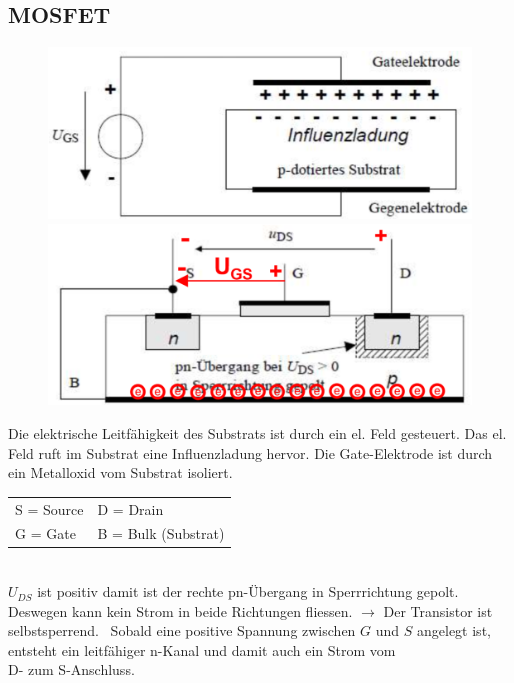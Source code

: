 \subsection{MOSFET}
\begin{figure}
    \vspace{-1cm}
    \includegraphics[width=\linewidth]{images/mosfetprinz}
    \newline
    \includegraphics[width=\linewidth]{images/mosfetprak}
\end{figure}
Die elektrische Leitfähigkeit des Substrats ist durch ein el. Feld gesteuert. Das el. Feld ruft im Substrat eine Influenzladung hervor.\newline
Die Gate-Elektrode ist durch ein Metalloxid vom Substrat isoliert.\\[0.3cm]
\begin{tabular}{ll}
    S = Source & D = Drain\\
    G = Gate & B = Bulk (Substrat)\\
\end{tabular}\\[0.3cm]
$ U_{DS} $ ist positiv damit ist der rechte pn-Übergang in Sperrrichtung gepolt. Deswegen kann kein Strom in beide Richtungen fliessen.\newline
$ \rightarrow $ Der Transistor ist selbstsperrend.\newline
\danger~Sobald eine positive Spannung zwischen $ G $ und $ S $ angelegt ist, entsteht ein leitfähiger n-Kanal und damit auch ein Strom vom \\D- zum S-Anschluss.
 \vspace{-0.2cm}
